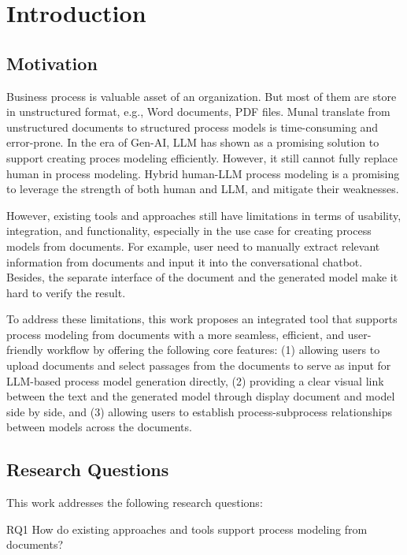 \chapter{Introduction}
\label{sec:intro}

\section{Motivation}
\label{sec:intro:mo}

Business process is valuable asset of an organization. But most of them are store in unstructured format, e.g., Word documents, PDF files. Munal translate from unstructured documents to structured process models is time-consuming and error-prone.
In the era of Gen-AI, LLM has shown as a promising solution to support creating proces modeling efficiently. However, it still cannot fully replace human in process modeling. Hybrid human-LLM process modeling is a promising  to leverage the strength of both human and LLM, and mitigate their weaknesses. 

However, existing tools and approaches still have limitations in terms of usability, integration, and functionality, especially in the use case for creating process models from documents. For example, user need to manually extract relevant information from documents and input it into the conversational chatbot. Besides, the separate interface of the document and the generated model make it hard to verify the result.

To address these limitations, this work proposes an integrated tool that supports process modeling from documents with a more seamless, efficient, and user-friendly workflow by offering the following core features: (1) allowing users to upload documents and select passages from the documents to serve as input for LLM-based process model generation directly, (2) providing a clear visual link between the text and the generated model through display document and model side by side, and (3) allowing users to establish process-subprocess relationships between models across the documents.

\section{Research Questions}
\label{sec:intro:rq}

This work addresses the following research questions:

RQ1 How do existing approaches and tools support process modeling from documents?

